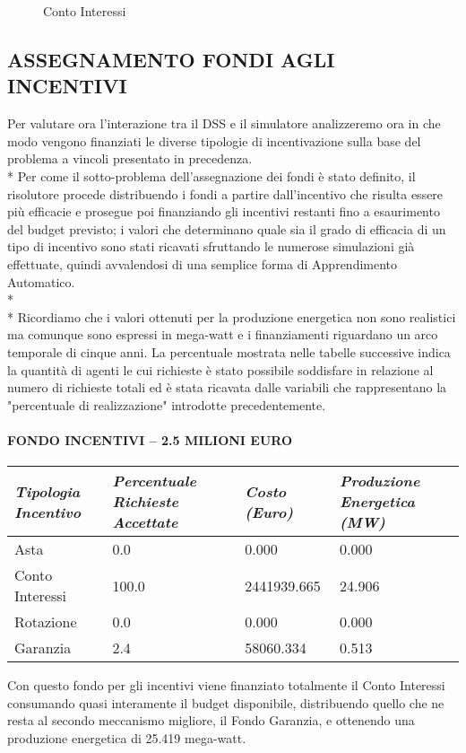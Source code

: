 \documentclass[12pt,a4paper,openright,twoside]{report}
\begin{document}
\begin{figure}[H]
	\centering
	\qquad
	\caption{Conto Interessi}
	\label{graphCIsoc}
\end{figure}


\subsection{ASSEGNAMENTO FONDI AGLI INCENTIVI}
Per valutare ora l'interazione tra il DSS e il simulatore analizzeremo ora in che modo vengono finanziati le diverse tipologie di incentivazione sulla base del problema a vincoli presentato in precedenza.\\*
Per come il sotto-problema dell'assegnazione dei fondi è stato definito, il risolutore procede distribuendo i fondi a partire dall'incentivo che risulta essere più efficacie e prosegue poi finanziando gli incentivi restanti fino a esaurimento del budget previsto; i valori che determinano quale sia il grado di efficacia di un tipo di incentivo sono stati ricavati sfruttando le numerose simulazioni già effettuate, quindi avvalendosi di una semplice forma di Apprendimento Automatico.
\\* \\*
Ricordiamo che i valori ottenuti per la produzione energetica non sono realistici ma comunque sono espressi in mega-watt e i finanziamenti riguardano un arco temporale di cinque anni. La percentuale mostrata nelle tabelle successive indica la quantità di agenti le cui richieste è stato possibile soddisfare in relazione al numero di richieste totali ed è stata ricavata dalle variabili che rappresentano la "percentuale di realizzazione" introdotte precedentemente.
\paragraph{FONDO INCENTIVI – 2.5 MILIONI EURO}
\begin{center}
	\begin{tabular}{ | p{3.5cm} | p{3.5cm} | p{3.5cm} | p{3.5cm} | }
		\hline
		\nohyphens{\emph{Tipologia Incentivo}} & \nohyphens{\emph{Percentuale Richieste Accettate}} & \nohyphens{\emph{Costo (Euro)}} & \nohyphens{\emph{Produzione Energetica (MW)}} \\ \hline
		Asta & 0.0 & 0.000 & 0.000 \\ \hline
		Conto Interessi & 100.0 & 2441939.665 & 24.906 \\ \hline
		Rotazione & 0.0 & 0.000 & 0.000 \\ \hline
		Garanzia & 2.4 & 58060.334 & 0.513 \\
		\hline
	\end{tabular}
\end{center}
Con questo fondo per gli incentivi viene finanziato totalmente il Conto Interessi consumando quasi interamente il budget disponibile, distribuendo quello che ne resta al secondo meccanismo migliore, il Fondo Garanzia, e ottenendo una produzione energetica di 25.419 mega-watt.
\end{document}
